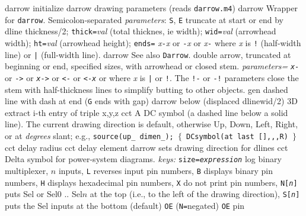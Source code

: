  {darrow}
  {initialize darrow drawing parameters (reads {\tt darrow.m4})}
  {darrow}
  {Wrapper for {\tt darrow}.
  Semicolon-separated {\sl parameters}:
    {\tt S}, {\tt E} truncate at start or end by dline thickness/2;
    {\tt thick=}{\sl val}   (total thicknes, ie width);
    {\tt wid=}{\sl val}     (arrowhead width);
    {\tt ht=}{\sl val}      (arrowhead height);
    {\tt ends=}
      {\sl x}{\tt -}{\sl x} or
      {\tt -}{\sl x} or
      {\sl x}{\tt -} where {\sl x} is {\tt !} (half-width line)
       or {\tt |} (full-width line).}
  {darrow}
  {See also {\tt Darrow}.
   double arrow, truncated at beginning or end, specified sizes,
    with arrowhead or closed stem.
    {\sl parameters=}
    {\tt {\sl x}-} or {\tt ->} or {\tt {\sl x}->} or {\tt <-} or {\tt <-{\sl x}}
    or {\tt <->} where {\sl x} is {\tt |} or {\tt !}.
    The {\tt !-} or {\tt -!} parameters close
    the stem with half-thickness lines to simplify butting to other objects. }
  {gen}
  {dashed line with dash at end ({\tt G} ends with gap)}
  {darrow}
  {below (displaced dlinewid/2)}
  {3D}
  {extract i-th entry of triple x,y,z}
  {cct}
  {A DC symbol (a dashed line below a solid line).
   The current drawing direction is default, otherwise Up, Down,
   Left, Right, or at {\sl degrees} slant; e.g., 
   {\tt source(up\_ dimen\_); $\lbrace$ DCsymbol(at last [],,,R) $\rbrace$}
    }
  {cct}
  {delay radius}
  {cct}
  {delay element}
  {darrow}
  {sets drawing direction for dlines}
  {cct}
  {Delta symbol for power-system diagrams.
   {\sl keys:} {\tt size={\sl expression}}}
  {log}
  {binary multiplexer, $n$ inputs,
    {\tt L} reverses input pin numbers,
    {\tt B} displays binary pin numbers,
    {\tt H} displays hexadecimal pin numbers,
    {\tt X} do not print pin numbers,
    {\tt N[{\sl n}]} puts Sel or Sel$0$ .. Sel$n$ at the top
    (i.e., to the left of the drawing direction),
    {\tt S[{\sl n}]} puts the Sel inputs at the bottom (default)
    {\tt OE} ({\tt N=}negated) {\tt OE} pin
    }
